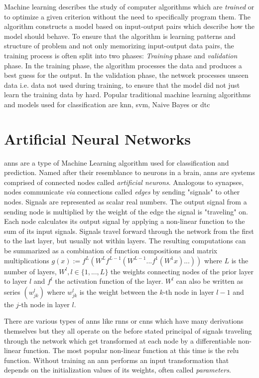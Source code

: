 Machine learning describes the study of computer algorithms which are \textit{trained} or  to optimize a given criterion without the need to specifically program them. The algorithm constructs a model based on input-output pairs which describe how the model should behave.
To ensure that the algorithm is learning patterns and structure of problem and not only memorizing input-output data pairs, the training process is often split into two phases: \textit{Training} phase and \textit{validation} phase. In the training phase, the algorithm processes the data and produces a best guess for the output. In the validation phase, the network processes unseen data i.e. data not used during training, to ensure that the model did not just learn the training data by hard. 
Popular traditional machine learning algorithms and models used for classification are \gls{knn}, \gls{svm}, Naive Bayes or \gls{dtc}
\par


  

\section{Artificial Neural Networks} \label{sec:background:ann}

\glspl{ann} are a type of Machine Learning algorithm used for classification and prediction. Named after their resemblance to neurons in a brain, \glspl{ann} are systems comprised of connected nodes called \textit{artificial neurons}. Analogous to synapses, nodes communicate \textit{via} connections called \textit{edges} by sending "signals" to other nodes. Signals are represented as scalar real numbers. The output signal from a sending node is multiplied by the weight of the edge the signal is "traveling" on. Each node calculates its output signal by applying a non-linear function to the sum of its input signals. Signals travel forward through the network from the first to the last layer, but usually not within layers. The resulting computations can be summarized as a combination of function compositions and matrix multiplications $g(x) := f^L(W^Lf^{L-1}(W^{L-1}...f^1(W^1x)...))$ where $L$ is the number of layers, $W^l, l \in \{1,...,L\}$ the weights connecting nodes of the prior layer to layer $l$ and $f^l$ the activation function of the layer. $W^l$ can also be written as series $(w^l_{jk})$ where $w^l_{jk}$ is the weight between the $k$-th node in layer $l-1$ and the $j$-th node in layer $l$. \par There are various types of \glspl{ann} like \glspl{rnn} or \glspl{cnn} which have many derivations themselves but they all operate on the before stated principal of signals traveling through the network which get transformed at each node by a differentiable non-linear function. The most popular non-linear function at this time is the \gls{relu} function. Without training an \gls{ann} performs an input transformation that depends on the initialization values of its weights, often called \textit{parameters}. \par

